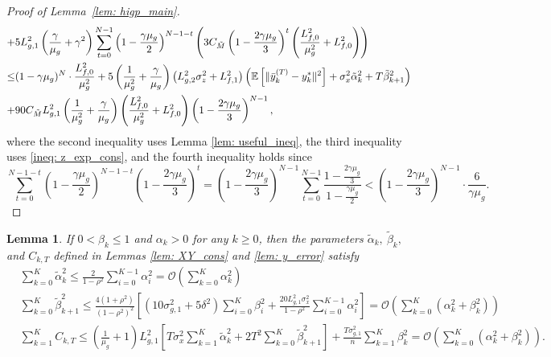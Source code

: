 \documentclass{article}
\theoremstyle{plain}
\newtheorem{lemma}[theorem]{Lemma}
\theoremstyle{definition}
\theoremstyle{remark}
\newcommand{\E}{\mathbb{E}}
\newcommand{\cO}{\mathcal{O}}
\begin{document}
\begin{proof}[Proof of Lemma~\ref{lem: higp_main}]
\begin{align}
            + &5L_{g,1}^2\left(\frac{\gamma}{\mu_g} + \gamma^2\right)\sum_{t=0}^{N-1}\left(1-\frac{\gamma\mu_g}{2}\right)^{N-1-t}\left(3C_{\tilde{M}}\left(1-\frac{2\gamma\mu_g}{3}\right)^t\left(\frac{L_{f,0}^2}{\mu_g^2} + L_{f,0}^2\right)\right) \notag\\
            \leq& (1-\gamma\mu_g)^{N}\cdot\frac{L_{f,0}^2}{\mu_g^2} + 5\left(\frac{1}{\mu_g^2} + \frac{\gamma}{\mu_g}\right)\left(L_{g,2}^2\sigma_z^2 + L_{f,1}^2\right)\left(\E\left[\|\bar{y}_k^{(T)} - y_k^*\|^2\right] + \sigma_x^2\tilde{\alpha}_k^2 + T\tilde{\beta}_{k+1}^2\right) \notag \\
            + &90C_{\tilde{M}}L_{g,1}^2\left(\frac{1}{\mu_g^2} + \frac{\gamma}{\mu_g}\right)\left(\frac{L_{f,0}^2}{\mu_g^2} +L_{f,0}^2\right)\left(1-\frac{2\gamma\mu_g}{3}\right)^{N-1},\label{ineq: dot_z_N}
    \end{align}
    where the second inequality uses Lemma \ref{lem: useful_ineq}, the third inequality uses \eqref{ineq: z_exp_cons}, and the fourth inequality holds since
    \[
        \sum_{t=0}^{N-1-t}\left(1-\frac{\gamma\mu_g}{2}\right)^{N-1-t}\left(1-\frac{2\gamma\mu_g}{3}\right)^t = \left(1-\frac{2\gamma\mu_g}{3}\right)^{N-1}\sum_{t=0}^{N-1}\frac{1-\frac{2\gamma\mu_g}{3}}{1-\frac{\gamma\mu_g}{2}} < \left(1-\frac{2\gamma\mu_g}{3}\right)^{N-1}\cdot \frac{6}{\gamma\mu_g}.
    \]
\end{proof}
\begin{lemma}\label{lem: all_const_sum}
    If $0< \beta_k\leq 1$ and $\alpha_k > 0$ for any $k\geq 0$, then the parameters $\tilde{\alpha}_k,\ \tilde{\beta}_k,$ and $C_{k,T}$ defined in Lemmas \ref{lem: XY_cons} and \ref{lem: y_error} satisfy
    \begin{align*}
        &\sum_{k=0}^{K}\tilde{\alpha}_k^2\leq \frac{2}{1-\rho^2}\sum_{i=0}^{K-1}\alpha_i^2 = \cO\left(\sum_{k=0}^{K}\alpha_k^2\right)\\
        &\sum_{k=0}^{K}\tilde{\beta}_{k+1}^2\leq \frac{4(1+\rho^2)}{(1-\rho^2)^2}\left[\left(10\sigma_{g,1}^2 + 5\delta^2\right)\sum_{i=0}^{K}\beta_i^2 + \frac{20L_{g,1}^2\sigma_x^2}{1-\rho^2}\sum_{i=0}^{K-1}\alpha_i^2\right] = \cO\left(\sum_{k=0}^{K}(\alpha_k^2+\beta_k^2)\right) \\
        &\sum_{k=1}^{K}C_{k,T}\leq \left(\frac{1}{\mu_g} + 1\right)L_{g,1}^2\left[T\sigma_x^2\sum_{k=1}^{K}\tilde{\alpha}_k^2 + 2T^2\sum_{k=0}^{K}\tilde{\beta}_{k+1}^2\right] + \frac{T\sigma_{g,1}^2}{n}\sum_{k=1}^{K}\beta_k^2 = \cO\left(\sum_{k=0}^{K}(\alpha_k^2+\beta_k^2)\right).
    \end{align*}
\end{lemma}
\end{document}
